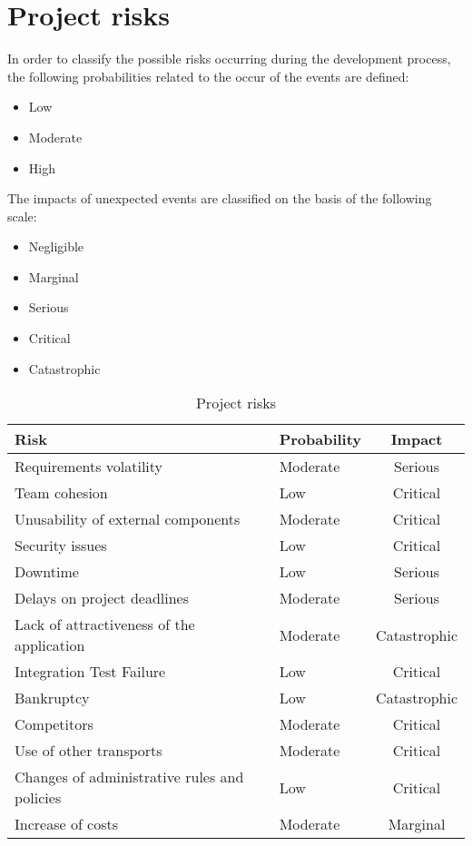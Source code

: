 \chapter{Project risks}
In order to classify the possible risks occurring during the development process, the following probabilities related to the occur of the events are defined:
\begin{itemize}
\item Low
\item Moderate
\item High
\end{itemize}

The impacts of unexpected events are classified on the basis of the following scale:
\begin{itemize}
\item Negligible
\item Marginal
\item Serious
\item Critical
\item Catastrophic
\end{itemize}

\clearpage
\begin{table}[!h]
\centering
\caption{Project risks}
\label{project-risks}
\begin{tabularx}{\linewidth}{XXc}
\hline
\textbf{Risk}                & \textbf{Probability} & \textbf{Impact} \\ \hline
Requirements volatility      & Moderate             & Serious \\
Team cohesion                & Low                  & Critical \\
Unusability of external components & Moderate       & Critical \\
Security issues              & Low                  & Critical \\
Downtime                     & Low                  & Serious \\
Delays on project deadlines  & Moderate             & Serious \\
Lack of attractiveness of  the application & Moderate & Catastrophic \\
Integration Test Failure     & Low                  & Critical \\
Bankruptcy                   & Low                  & Catastrophic \\
Competitors                  & Moderate             & Critical \\
Use of other transports      & Moderate             & Critical \\
Changes of administrative rules and policies & Low  & Critical \\
Increase of costs & Moderate & Marginal \\
\end{tabularx}
\end{table}

